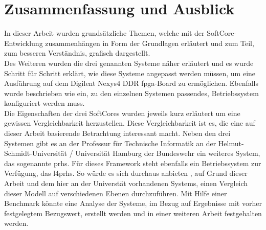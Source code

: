 \chapter{Zusammenfassung und Ausblick}\label{ch:schluss}

In dieser Arbeit wurden grundsätzliche Themen, welche mit der SoftCore-Entwicklung zusammenhängen in Form der Grundlagen erläutert und zum Teil,
 zum besseren Verständnis, grafisch dargestellt.\\
Des Weiteren wurden die drei genannten Systeme näher erläutert und es wurde Schritt für Schritt erklärt, wie diese
Systeme angepasst werden müssen, um eine Ausführung auf dem Digilent Nexys4 DDR \ac{fpga}-Board zu ermöglichen.
Ebenfalls wurde beschrieben wie ein, zu den einzelnen Systemen passendes, Betriebssystem konfiguriert werden muss.\\
Die Eigenschaften der drei SoftCores wurden jeweils kurz erläutert um eine gewissen Vergleichbarkeit herzustellen.
Diese Vergleichbarkeit ist es, die eine auf dieser Arbeit basierende Betrachtung interessant macht. Neben den drei Systemen gibt es
an der Professur für Technische Informatik an der Helmut-Schmidt-Universität / Universität Hamburg der Bundeswehr ein weiteres System,
das sogenannte \ac{prhs}. Für dieses Framework steht ebenfalls ein Betriebssystem zur Verfügung, das \ac{l4prhs}. So würde es sich durchaus anbieten
, auf Grund dieser Arbeit und dem hier an der Universtät vorhandenen Systems, einen Vergleich dieser Modell auf verschiedenen Ebenen durchzuführen. Mit Hilfe
einer Benchmark könnte eine Analyse der Systeme, im Bezug auf Ergebnisse mit vorher festgelegtem Bezugswert, erstellt werden und in einer weiteren Arbeit festgehalten werden.
